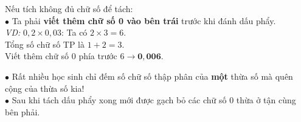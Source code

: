\documentclass[14pt,a4paper,oneside]{extbook}
\begin{document}
\vspace{3mm}

\noindent
\begin{minipage}[t]{0.54\textwidth}
  \begin{tcolorbox}[
    enhanced,
    title={\footnotesize\bfseries\color{white}\faExclamationCircle\ Khi tích có ít chữ số hơn số cần tách},
    colback=green!3!white,
    colframe=green!60!black,
    arc=2.5mm, boxrule=0.8pt, top=1.8mm, bottom=1.8mm, left=2.2mm, right=2.2mm
  ]
    \footnotesize
    Nếu tích không đủ chữ số để tách:\\
    $\bullet$ Ta phải \textbf{viết thêm chữ số 0 vào bên trái} trước khi đánh dấu phẩy.\\
    \textit{VD:} $0,2 \times 0,03$: Ta có $2 \times 3 = 6$.\\
    Tổng số chữ số TP là $1 + 2 = 3$.\\
    Viết thêm chữ số $0$ phía trước $6 \rightarrow \mathbf{0,006}$.
  \end{tcolorbox}
\end{minipage}%
\hfill
\begin{minipage}[t]{0.44\textwidth}
  \begin{tcolorbox}[
    enhanced,
    title={\footnotesize\bfseries\color{white}\faExclamationTriangle\ Mẹo tránh bẫy trắc nghiệm},
    colback=red!2!white,
    colframe=red!70!black,
    arc=2.5mm, boxrule=0.8pt, top=1.8mm, bottom=1.8mm, left=2.2mm, right=2.2mm
  ]
    \footnotesize
    $\bullet$ Rất nhiều học sinh chỉ đếm số chữ số thập phân của \textbf{một} thừa số mà quên cộng của thừa số kia!\\
    $\bullet$ Sau khi tách dấu phẩy xong mới được gạch bỏ các chữ số $0$ thừa ở tận cùng bên phải.
  \end{tcolorbox}
\end{minipage}
\end{document}
